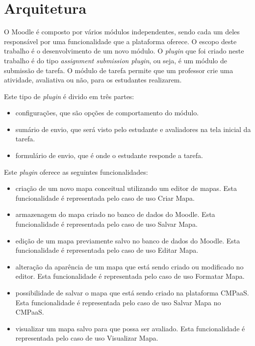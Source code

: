 \documentclass[
	12pt,				%
	openright,			%
	oneside,			%
	a4paper,			%
	english,			%
	french,				%
	spanish,			%
	brazil				%
	]{abntex2}
\begin{document}
\section{Arquitetura}

O Moodle é composto por vários módulos independentes, sendo cada um deles responsável por uma funcionalidade que a plataforma oferece. O escopo deste trabalho é o desenvolvimento de um novo módulo. O \textit{plugin} que foi criado neste trabalho é do tipo \textit{assignment submission plugin}, ou seja, é um módulo de submissão de tarefa. O módulo de tarefa permite que um professor crie uma atividade, avaliativa ou não, para os estudantes realizarem.

Este tipo de \textit{plugin} é divido em três partes:
\begin{itemize}
	\item configurações, que são opções de comportamento do módulo.
	\item sumário de envio, que será visto pelo estudante e avaliadores na tela inicial da tarefa.
	\item formulário de envio, que é onde o estudante responde a tarefa.  
\end{itemize} 

%
Este \textit{plugin} oferece as seguintes funcionalidades:

\begin{itemize}
	\item criação de um novo mapa conceitual utilizando um editor de mapas. Esta funcionalidade é representada pelo caso de uso Criar Mapa.
	\item armazenagem do mapa criado no banco de dados do Moodle. Esta funcionalidade é representada pelo caso de uso Salvar Mapa.
	\item edição de um mapa previamente salvo no banco de dados do Moodle. Esta funcionalidade é representada pelo caso de uso Editar Mapa.
	\item alteração da aparência de um mapa que está sendo criado ou modificado no editor. Esta funcionalidade é representada pelo caso de uso Formatar Mapa.  
	\item possibilidade de salvar o mapa que está sendo criado na plataforma CMPaaS. Esta funcionalidade é representada pelo caso de uso Salvar Mapa no CMPaaS.  
	\item visualizar um mapa salvo para que possa ser avaliado. Esta funcionalidade é representada pelo caso de uso Visualizar Mapa.    
\end{itemize} 
\end{document}
